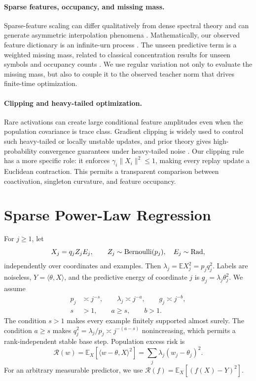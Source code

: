 \documentclass[letterpaper]{article}
\newcommand{\E}{\mathbb E}
\newcommand{\R}{\mathcal R}
\begin{document}
\paragraph{Sparse features, occupancy, and missing mass.}
Sparse-feature scaling can differ qualitatively from dense spectral theory and
can generate asymmetric interpolation phenomena \cite{sous2026asymmetric,
belkin2019reconciling,hastie2022surprises}. Mathematically, our observed
feature dictionary is an infinite-urn process \cite{karlin1967central}. The
unseen predictive term is a weighted missing mass, related to classical
concentration results for unseen symbols and occupancy counts
\cite{berend2013missing,benhamou2017concentration}. We use regular variation not
only to evaluate the missing mass, but also to couple it to the observed teacher
norm that drives finite-time optimization.

\paragraph{Clipping and heavy-tailed optimization.}
Rare activations can create large conditional feature amplitudes even when the
population covariance is trace class. Gradient clipping is widely used to
control such heavy-tailed or locally unstable updates, and prior theory gives
high-probability convergence guarantees under heavy-tailed noise
\cite{gorbunov2020clipping,zhang2020attention}. Our clipping rule has a more
specific role: it enforces $\gamma_i\|X_i\|^2\le1$, making every replay update a
Euclidean contraction. This permits a transparent comparison between
coactivation, singleton curvature, and feature occupancy.

\section{Sparse Power-Law Regression}

For $j\ge1$, let
\begin{equation}
X_j=q_jZ_jE_j,\qquad
Z_j\sim{\rm Bernoulli}(p_j),\quad E_j\sim{\rm Rad},
\label{eq:model}
\end{equation}
independently over coordinates and examples. Then
$\lambda_j=\E X_j^2=p_jq_j^2$. Labels are noiseless,
$Y=\langle\theta,X\rangle$, and the predictive energy of coordinate $j$ is
$g_j=\lambda_j\theta_j^2$. We assume
\begin{equation}
\begin{aligned}
p_j&\asymp j^{-s},\qquad
\lambda_j\asymp j^{-a},\qquad
g_j\asymp j^{-b},\\
s&>1,\qquad a\ge s,\qquad b>1.
\end{aligned}
\label{eq:powerlaws}
\end{equation}
The condition $s>1$ makes every example finitely supported almost surely. The
condition $a\ge s$ makes $q_j^2=\lambda_j/p_j\asymp j^{-(a-s)}$ nonincreasing,
which permits a rank-independent stable base step. Population excess risk is
\[
\R(w)=\E_X[\langle w-\theta,X\rangle^2]
=\sum_j\lambda_j(w_j-\theta_j)^2.
\]
For an arbitrary measurable predictor, we use
$\R(f)=\E_X[(f(X)-Y)^2]$.
\end{document}
